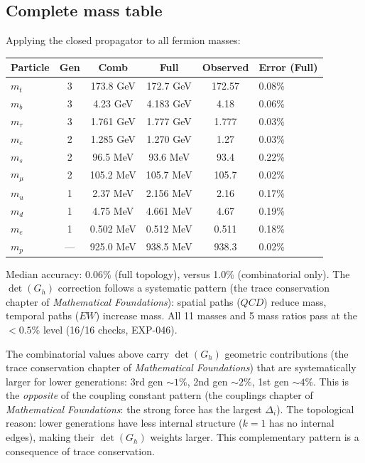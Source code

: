 \subsection{Complete mass table}

Applying the closed propagator to all fermion masses:

\begin{center}
\begin{tabular}{lccccl}
\hline
Particle & Gen & Comb & Full & Observed & Error (Full) \\
\hline
$m_t$ & 3 & 173.8 GeV & 172.7 GeV & 172.57 & 0.08\% \\
$m_b$ & 3 & 4.23 GeV & 4.183 GeV & 4.18 & 0.06\% \\
$m_\tau$ & 3 & 1.761 GeV & 1.777 GeV & 1.777 & 0.03\% \\
\hline
$m_c$ & 2 & 1.285 GeV & 1.270 GeV & 1.27 & 0.03\% \\
$m_s$ & 2 & 96.5 MeV & 93.6 MeV & 93.4 & 0.22\% \\
$m_\mu$ & 2 & 105.2 MeV & 105.7 MeV & 105.7 & 0.02\% \\
\hline
$m_u$ & 1 & 2.37 MeV & 2.156 MeV & 2.16 & 0.17\% \\
$m_d$ & 1 & 4.75 MeV & 4.661 MeV & 4.67 & 0.19\% \\
$m_e$ & 1 & 0.502 MeV & 0.512 MeV & 0.511 & 0.18\% \\
\hline
$m_p$ & --- & 925.0 MeV & 938.5 MeV & 938.3 & 0.02\% \\
\hline
\end{tabular}
\end{center}

Median accuracy: 0.06\% (full topology), versus 1.0\% (combinatorial only).  The $\det(G_h)$ correction follows a systematic pattern (the trace conservation chapter of \textit{Mathematical Foundations}): spatial paths ($QCD$) reduce mass, temporal paths ($EW$) increase mass.  All 11 masses and 5 mass ratios pass at the $< 0.5\%$ level (16/16 checks, EXP-046).

\begin{remark}
The combinatorial values above carry $\det(G_h)$ geometric contributions (the trace conservation chapter of \textit{Mathematical Foundations}) that are systematically larger for lower generations: 3rd gen $\sim 1\%$, 2nd gen $\sim 2\%$, 1st gen $\sim 4\%$. This is the \emph{opposite} of the coupling constant pattern (the couplings chapter of \textit{Mathematical Foundations}: the strong force has the largest $\Delta_i$). The topological reason: lower generations have less internal structure ($k = 1$ has no internal edges), making their $\det(G_h)$ weights larger. This complementary pattern is a consequence of trace conservation.
\end{remark}

